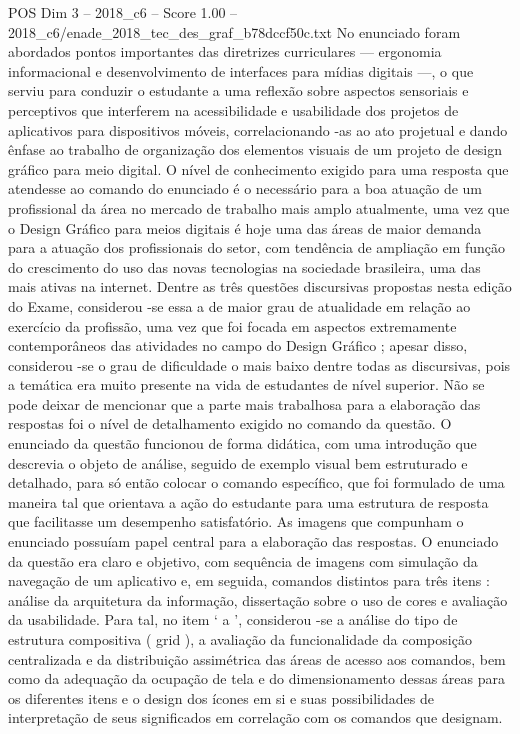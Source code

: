 \begin{textsample}{POS Dim 3 – 2018\_c6 – Score 1.00 – 2018\_c6/enade\_2018\_tec\_des\_graf\_b78dccf50c.txt}
No enunciado foram abordados pontos importantes das diretrizes curriculares — ergonomia informacional e desenvolvimento de interfaces para mídias digitais —, o que serviu para conduzir o estudante a uma reflexão sobre aspectos sensoriais e perceptivos que interferem na acessibilidade e usabilidade dos projetos de aplicativos para dispositivos móveis, correlacionando -as ao ato projetual e dando ênfase ao trabalho de organização dos elementos visuais de um projeto de design gráfico para meio digital.
O nível de conhecimento exigido para uma resposta que atendesse ao comando do enunciado é o necessário para a boa atuação de um profissional da área no mercado de trabalho mais amplo atualmente, uma vez que o Design Gráfico para meios digitais é hoje uma das áreas de maior demanda para a atuação dos profissionais do setor, com tendência de ampliação em função do crescimento do uso das novas tecnologias na sociedade brasileira, uma das mais ativas na internet.
Dentre as três questões discursivas propostas nesta edição do Exame, considerou -se essa a de maior grau de atualidade em relação ao exercício da profissão, uma vez que foi focada em aspectos extremamente contemporâneos das atividades no campo do Design Gráfico ; apesar disso, considerou -se o grau de dificuldade o mais baixo dentre todas as discursivas, pois a temática era muito presente na vida de estudantes de nível superior.
Não se pode deixar de mencionar que a parte mais trabalhosa para a elaboração das respostas foi o nível de detalhamento exigido no comando da questão.
O enunciado da questão funcionou de forma didática, com uma introdução que descrevia o objeto de análise, seguido de exemplo visual bem estruturado e detalhado, para só então colocar o comando específico, que foi formulado de uma maneira tal que orientava a ação do estudante para uma estrutura de resposta que facilitasse um desempenho satisfatório.
As imagens que compunham o enunciado possuíam papel central para a elaboração das respostas.
O enunciado da questão era claro e objetivo, com sequência de imagens com simulação da navegação de um aplicativo e, em seguida, comandos distintos para três itens : análise da arquitetura da informação, dissertação sobre o uso de cores e avaliação da usabilidade.
Para tal, no item ‘ a ’, considerou -se a análise do tipo de estrutura compositiva ( grid ), a avaliação da funcionalidade da composição centralizada e da distribuição assimétrica das áreas de acesso aos comandos, bem como da adequação da ocupação de tela e do dimensionamento dessas áreas para os diferentes itens e o design dos ícones em si e suas possibilidades de interpretação de seus significados em correlação com os comandos que designam.

\end{textsample}
